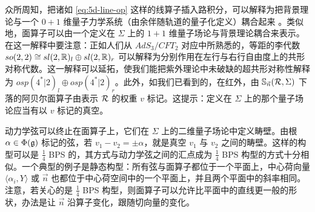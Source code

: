 众所周知，把诸如 \eqref{eq:5d-line-op}
这样的线算子插入路积分，可以解释为把背景理论与一个 $0+1$ 维量子力学系统（由余伴随轨道的量子化定义）耦合起来 \cite{Alekseev:1988vx}。类似地，面算子可以由一个定义在 $\Sigma$ 上的 $1+1$ 维量子场论与背景理论耦合来表示。在这一解释中要注意：正如人们从 $AdS_3/CFT_2$ 对应中所熟悉的，等距的李代数 $so(2,2)\cong sl(2,\mathbb{R})_l \oplus sl(2,\mathbb{R})_r$ 可以解释为分别作用在左行与右行自由度上的共形对称代数。这一解释可以延拓，使我们能把紫外理论中未破缺的超共形对称性解释为 $osp(4^*\vert 2)_l \oplus osp(4^*\vert 2)_r$。此外，如我们已看到的，在红外，由 ${\mathbb S}_{\vec n}(\mathcal{R},\Sigma)$ 下落的阿贝尔面算子由表示 $\mathcal{R}$ 的权重 $v$ 标记。这提示：定义在 $\Sigma$ 上的那个量子场论应当有以 $v$ 标记的真空。

动力学弦可以终止在面算子上，它们在 $\Sigma$ 上的二维量子场论中定义畴壁。由根 $\alpha \in \Phi(\mathfrak{g})$ 标记的弦，若 $v_1 - v_2 = \pm \alpha$，就是真空 $v_1$ 与 $v_2$ 之间的畴壁。这样的构型可以是 $\frac{1}{4}$ BPS 的，其方式与动力学弦之间的汇点成为 $\frac{1}{4}$ BPS 构型的方式十分相似。一个典型的例子是静态构型：所有弦与面算子都位于一个平面上，中心荷向量 $\langle \alpha_i,Y\rangle$ 或 $\vec n$ 也都位于中心荷空间中的一个平面上，并且两个平面中的斜率相同。注意，若关心的是 $\frac{1}{4}$ BPS 构型，则面算子可以允许比平面中的直线更一般的形状，办法是让 $\vec n$ 沿算子变化，跟随切向量的变化。
